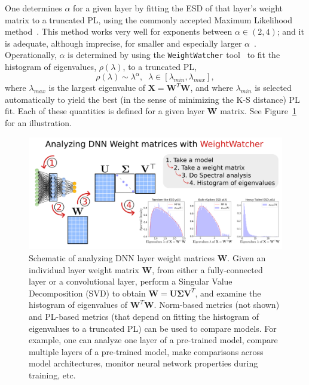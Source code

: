 One determines $\alpha$ for a given layer by fitting the ESD of that layer's weight matrix to a truncated PL, using the commonly accepted Maximum Likelihood method~\cite{CSN09_powerlaw,ABP14}.
This method works very well for exponents between $\alpha\in(2,4)$; and it is adequate, although imprecise, for smaller and especially larger $\alpha$~\cite{newman2005_zipf}. 
%
Operationally, $\alpha$ is determined by using the \texttt{WeightWatcher} tool~\cite{weightwatcher_package} to fit the histogram of eigenvalues, $\rho(\lambda)$, to a truncated PL, 
\begin{equation}
\rho(\lambda)\sim\lambda^{\alpha},\;\;\lambda\in[\lambda_{min},\lambda_{max}] ,
\end{equation}
where $\lambda_{max}$ is the largest eigenvalue of $\mathbf{X}=\mathbf{W}^{T}\mathbf{W}$, and 
where $\lambda_{min}$ is selected automatically to yield the best (in the sense of minimizing the K-S distance) PL fit.
Each of these quantities is defined for a given layer $\mathbf{W}$ matrix.
See Figure~\ref{fig:ww} for an illustration.

\begin{figure}[t]
    \centering
    \includegraphics[width=15.0cm]{img/WeightWatcher_v3}
    \caption{Schematic of analyzing DNN layer weight matrices $\mathbf{W}$.  
             Given an individual layer weight matrix $\mathbf{W}$, from either a fully-connected layer or a convolutional layer, perform a Singular Value Decomposition (SVD) to obtain $\mathbf{W} = \mathbf{U} \mathbf{\Sigma} \mathbf{V}^{T}$, and examine the histogram of eigenvalues of $\mathbf{W}^{T}\mathbf{W}$.
             Norm-based metrics (not shown) and PL-based metrics (that depend on fitting the histogram of eigenvalues to a truncated PL) can be used to compare models.
             For example, one can analyze one layer of a pre-trained model, compare multiple layers of a pre-trained model, make comparisons across model architectures, monitor neural network properties during training, etc. 
}
    \label{fig:ww}
\end{figure}



